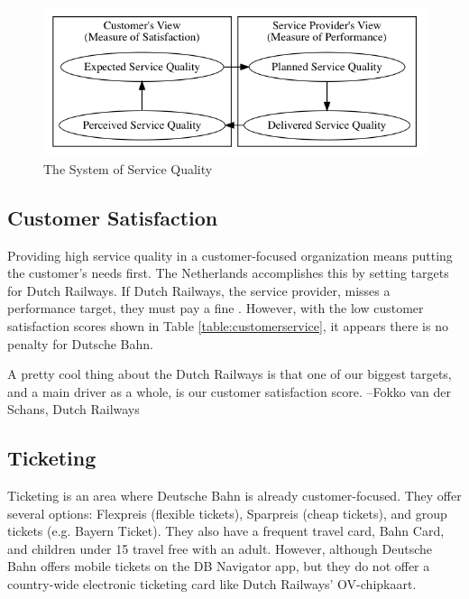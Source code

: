 \documentclass{article}
\begin{document}
\begin{figure}[H]
    \centering
    \includegraphics[width=\textwidth]{din.png}
    \caption{The System of Service Quality \citep{en13816}}
    \label{fig:servicequality}
\end{figure}

\subsection{Customer Satisfaction}
Providing high service quality in a customer-focused organization means putting the customer's needs first. The Netherlands accomplishes this by setting targets for Dutch Railways. If Dutch Railways, the service provider, misses a performance target, they must pay a fine \citep{ns-transparent}. However, with the low customer satisfaction scores shown in Table \ref{table:customerservice}, it appears there is no penalty for Dutsche Bahn.

\begin{framed}
\noindent A pretty cool thing about the Dutch Railways is that one of our biggest targets, and a main driver as a whole, is our customer satisfaction score. --Fokko van der Schans, Dutch Railways \citep{lawson2017}
\end{framed}

\subsection{Ticketing}
Ticketing is an area where Deutsche Bahn is already customer-focused. They offer several options: Flexpreis (flexible tickets), Sparpreis (cheap tickets), and group tickets (e.g. Bayern Ticket). They also have a frequent travel card, Bahn Card, and children under 15 travel free with an adult. However, although Deutsche Bahn offers mobile tickets on the DB Navigator app, but they do not offer a country-wide electronic ticketing card like Dutch Railways' OV-chipkaart.
\end{document}
